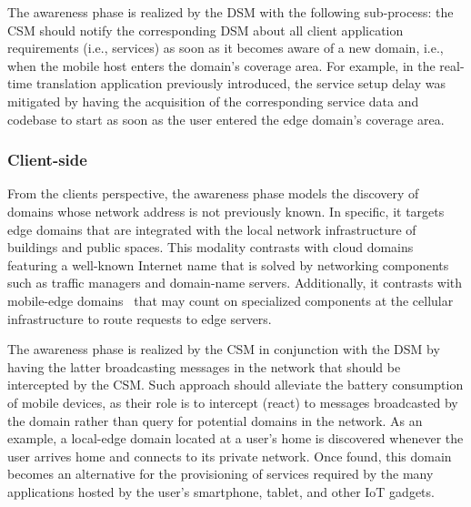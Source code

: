 The awareness phase is realized by the DSM with the following sub-process: the CSM should notify the corresponding DSM about all client application requirements (i.e., services) as soon as it becomes aware of a new domain, i.e., when the mobile host enters the domain's coverage area. For example, in the real-time translation application previously introduced, the service setup delay was mitigated by having the acquisition of the corresponding service data and codebase to start as soon as the user entered the edge domain's coverage area.

\subsubsection*{Client-side} From the clients perspective, the awareness phase models the discovery of domains whose network address is not previously known. In specific, it targets edge domains that are integrated with the local network infrastructure of buildings and public spaces. This modality contrasts with cloud domains featuring a well-known Internet name that is solved by networking components such as traffic managers and domain-name servers. Additionally, it contrasts with mobile-edge domains~\cite{} that may count on specialized components at the cellular infrastructure to route requests to edge servers. 

The awareness phase is realized by the CSM in conjunction with the DSM by having the latter broadcasting messages in the network that should be intercepted by the CSM. 
Such approach should alleviate the battery consumption of mobile devices, as their role is to intercept (react) to messages broadcasted by the domain rather than query for potential domains in the network. As an example, a local-edge domain located at a user's home is discovered whenever the user arrives home and connects to its private network. Once found, this domain becomes an alternative for the provisioning of services required by the many applications hosted by the user's smartphone, tablet, and other IoT gadgets. %



